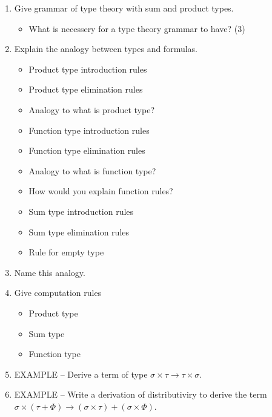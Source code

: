 \documentclass[fleqn]{article}
\begin{document}
\begin{enumerate}
    \item Give grammar of type theory with sum and product types.
    \begin{itemize}
        \item What is necessery for a type theory grammar to have? (3)
    \end{itemize}
    \item Explain the analogy between types and formulas.
    \begin{itemize}
        \item Product type introduction rules
        \item Product type elimination rules
        \item Analogy to what is product type?
        \item Function type introduction rules
        \item Function type elimination rules
        \item Analogy to what is function type?
        \item How would you explain function rules?
        \item Sum type introduction rules
        \item Sum type elimination rules
        \item Rule for empty type
    \end{itemize}
    \item Name this analogy.
    \item Give computation rules
    \begin{itemize}
        \item Product type
        \item Sum type 
        \item Function type
    \end{itemize}
    \item EXAMPLE -- Derive a term of type $\sigma \times \tau \rightarrow \tau \times \sigma$.
    \item EXAMPLE -- Write a derivation of distributiviry to derive the term $\sigma \times (\tau + \Phi) \rightarrow (\sigma \times \tau) + (\sigma \times \Phi)$.
\end{enumerate}
\end{document}
